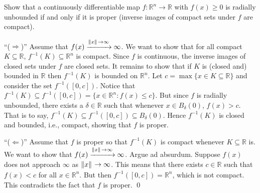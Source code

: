 \bonusquestion[20]
%
Show that a continuously differentiable map $f: \mathbb{R}^n \rightarrow
\mathbb{R}$ with $f(x) \geq 0$ is radially unbounded if and only if it is proper
(inverse images of compact sets under $f$ are compact).

\begin{solution}

``($\Rightarrow$)'' Assume that $f(x) \xrightarrow{\left\|{x}\right\|_{{}_{}} \to \infty}
\infty$. We want to show that for all compact $K \subseteq \mathbb{R}$,
$f^{-1}(K) \subseteq \mathbb{R}^n$ is compact. Since $f$ is continuous, the
inverse images of closed sets under $f$ are closed sets. It remains to show that
if $K$ is (closed and) bounded in $\mathbb{R}$ then $f^{-1}(K)$ is bounded on
$\mathbb{R}^n$. Let $c = \max\{ x \in K \subseteq \mathbb{R} \}$ and consider
the set $f^{-1}([0, c])$. Notice that $f^{-1}(K) \subseteq f^{-1}([0,c]) = \{ x
\in \mathbb{R}^n: f(x) \leq c \}$. But since $f$ is radially unbounded, there
exists a $\delta \in \mathbb{R}$ such that whenever $x \in B_\delta(0)$, $f(x) >
c$. That is to say, $f^{-1}(K) \subseteq f^{-1}([0,c]) \subseteq B_\delta(0)$.
Hence $f^{-1}(K)$ is closed and bounded, i.e., compact, showing that $f$ is
proper.

``($\Leftarrow$)'' Assume that $f$ is proper so that $f^{-1}(K)$ is compact
whenever $K \subseteq \mathbb{R}$ is. We want to show that $f(x)
\xrightarrow{\left\|{x}\right\|_{{}_{}} \to \infty} \infty$. Argue ad absurdum. Suppose $f(x)$
does not approach $\infty$ as $\left\|{x}\right\|_{{}_{}} \to \infty$. This means that there
exists $c \in \mathbb{R}$ such that $f(x) < c$ for all $x \in \mathbb{R}^n$. But
then $f^{-1}([0,c]) = \mathbb{R}^n$, which is not compact. This contradicts the
fact that $f$ is proper. \hfill \qed

\end{solution}